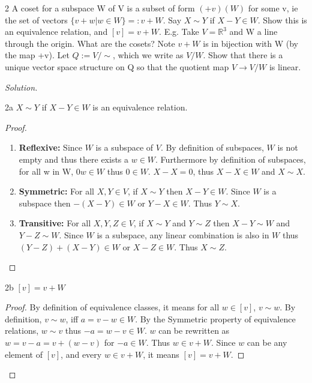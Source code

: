 \documentclass{article}
\newcommand{\R}{\mathbb{R}}
\newcommand{\rarr}[0]{\rightarrow}
\newenvironment{solution}
{\renewcommand\qedsymbol{$\blacksquare$}\begin{proof}[Solution]}
		{\end{proof}}
\begin{document}
\bigskip

\begin{PROB}{2}\label{Problem 2.}
	A coset for a subspace W of V is a subset of form $(+v)(W)$ for some v, ie the set of vectors $\{v + w| w \in W\} =: v + W$. Say $X \sim Y$ if $X - Y \in W$. Show this is an equivalence relation, and $[v] = v + W$.  E.g. Take $V = \R^3$ and W a line through the origin. What are the cosets? Note $v + W$ is in bijection with W (by the map +v).  Let $Q := V/\sim$, which we write as $V/W$. Show that there is a unique vector space structure on Q so that the quotient map $V \rarr V/W$ is linear.
\end{PROB}
\begin{solution}
	\begin{claim}{2a}
		$X \sim Y$ if $X - Y \in W$ is an equivalence relation.
	\end{claim}
	\begin{proof}
		\begin{enumerate}{}
			\item \textbf{Reflexive:} Since $W$ is a subspace of $V$. By definition of subspaces, $W$ is not empty and thus there exists a $w \in W$. Furthermore by definition of subspaces, for all w in W, $0w \in W$ thus $0 \in W$. $X - X = 0$, thus $X - X \in W$ and $X \sim X$.
			\item \textbf{Symmetric:} For all $X, Y \in V$, if $X \sim Y$ then $X - Y \in W$. Since $W$ is a subspace then $-(X - Y) \in W$ or $Y - X \in W$. Thus $Y \sim X$.
			\item \textbf{Transitive:} For all $X, Y, Z \in V$, if $X \sim Y$ and $Y \sim Z$ then $X - Y \sim W$ and $Y - Z \sim W$. Since $W$ is a subspace, any linear combination is also in $W$ thus $(Y - Z) + (X - Y) \in W$ or $X - Z \in W$. Thus $X \sim Z$.
		\end{enumerate}
	\end{proof}


	\begin{claim}{2b}
		$[v] = v + W$
	\end{claim}
	\begin{proof}
		By definition of equivalence classes, it means for all $w \in [v]$, $v \sim w$. By definition, $v \sim w$, iff $a = v - w \in W$. By the Symmetric property of equivalence relations, $w \sim v$ thus $-a = w - v \in W$. $w$ can be rewritten as $w = v - a = v + (w - v)$ for $-a \in W$. Thus $w \in v + W$. Since $w$ can be any element of $[v]$, and every $w \in v + W$, it means $[v] = v + W$.
	\end{proof}


\end{solution}
\end{document}
